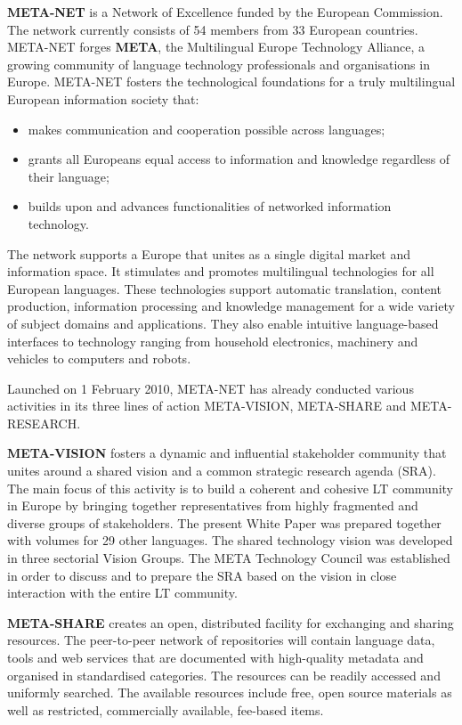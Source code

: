 \begin{multicols}{2}

\textbf{META-NET} is a Network of Excellence funded by the European Commission. The network currently consists of 54 members from 33 European countries. 
META-NET forges \textbf{META}, the Multilingual Europe Technology Alliance, a growing community of language technology professionals and organisations in Europe.
META-NET fosters the technological foundations for a truly multilingual European information society that:

\begin{itemize}
\item makes communication and cooperation possible across languages;
\item grants all Europeans equal access to information and knowledge regardless of their language;
\item builds upon and advances functionalities of networked information technology.
\end{itemize}

The network supports a Europe that unites as a single digital market and information space. It stimulates and promotes multilingual technologies for all European languages. These technologies support automatic translation, content production, information processing and knowledge management for a wide variety of subject domains and applications. They also enable intuitive language-based interfaces to technology ranging from household electronics, machinery and vehicles to computers and robots.

Launched on 1 February 2010, META-NET has already conducted various activities in its three lines of action META-VISION, META-SHARE and META-RESEARCH. 

\textbf{META-VISION} fosters a dynamic and influential stakeholder community that unites around a shared vision and a common strategic research agenda (SRA). The main focus of this activity is to build a coherent and cohesive LT community in Europe by bringing together representatives from highly fragmented and diverse groups of stakeholders. The present White Paper was prepared together with volumes for 29 other languages. The shared technology vision was developed in three sectorial Vision Groups. The META Technology Council was established in order to discuss and to prepare the SRA based on the vision in close interaction with the entire LT community.

\textbf{META-SHARE} creates an open, distributed facility for exchanging and sharing resources. The peer-to-peer network of repositories will contain language data, tools and web services that are documented with high-quality metadata and organised in standardised categories. The resources can be readily accessed and uniformly searched. The available resources include free, open source materials as well as restricted, commercially available, fee-based items. 


\end{multicols}
